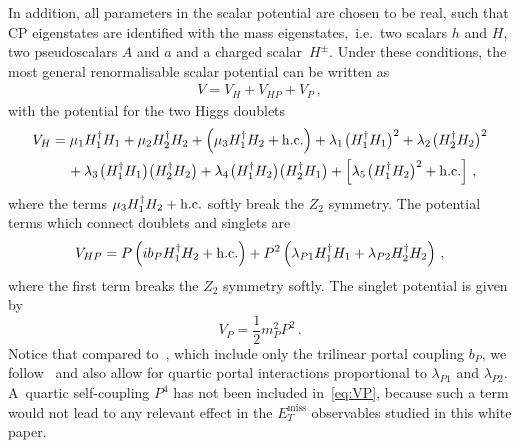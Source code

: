 \documentclass[a4paper, 11pt,notoc]{article}
\newcommand{\MET}{\ensuremath{E_T^\mathrm{miss}}\xspace}
\begin{document}
In addition, all parameters in the scalar potential are chosen to be real, such that CP eigenstates are identified with the mass eigenstates,~i.e.~two scalars $h$ and $H$, two pseudoscalars $A$ and $a$ and a charged scalar~$H^\pm$. Under these conditions, the most general renormalisable scalar potential can be written as 
\begin{align} \label{eq:V2HDMa}
V=V_H+V_{HP}+V_P\,,
\end{align}
with the potential for the two Higgs doublets
\begin{equation}\label{eq:VH}
\begin{split}
V_{H} & = \mu_1 H_1^\dagger H_1 + \mu_2 H_2^\dagger H_2 + \left ( \mu_3  H_1^\dagger H_2 + {\rm h.c.} \right ) + \lambda_1  \hspace{0.25mm} \big ( H_1^\dagger H_1  \big )^2  + \lambda_2  \hspace{0.25mm} \big ( H_2^\dagger H_2 \big  )^2  \\
& \phantom{xx} +  \lambda_3 \hspace{0.25mm} \big ( H_1^\dagger H_1  \big ) \big ( H_2^\dagger H_2  \big ) + \lambda_4  \hspace{0.25mm} \big ( H_1^\dagger H_2  \big ) \big ( H_2^\dagger H_1  \big ) + \left [ \lambda_5   \hspace{0.25mm} \big ( H_1^\dagger H_2 \big )^2 + {\rm h.c.} \right ]  \,,
\end{split}
\end{equation}
where the terms $\mu_3  H_1^\dagger H_2 + {\rm h.c.}$  softly break the  $Z_2$ symmetry. The potential terms which connect doublets and singlets are 
\begin{equation} \label{eq:VHP}
\begin{split}
V_{HP}  = P \left ( i  b_P   H_1^\dagger H_2 + {\rm h.c.} \right ) + P^2 \left (  \lambda_{P1}  H_1^\dagger H_1 +   \lambda_{P2}    H_2^\dagger H_2 \right )  \,,
\end{split} 
\end{equation}
where the first term breaks the  $Z_2$ symmetry softly.  The singlet potential is given by 
\begin{equation} \label{eq:VP}
V_{P}  =  \frac{1}{2}  m_P^2  P^2  \,.
\end{equation}
Notice  that compared to~\cite{Ipek:2014gua,No:2015xqa,Goncalves:2016iyg,Tunney:2017yfp}, which include only the trilinear portal coupling $b_P$, we  follow~\cite{Bauer:2017ota} and also allow for quartic portal interactions proportional to $\lambda_{P1}$ and  $\lambda_{P2}$. A~quartic self-coupling $P^4$ has not been included in~\eqref{eq:VP}, because such a term would not lead to any relevant effect in the $\MET$ observables studied in this white paper.
\end{document}
